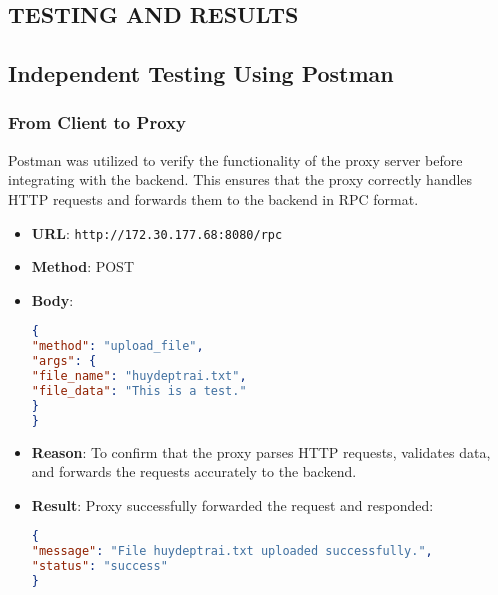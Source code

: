 \documentclass{article}
\begin{document}
 
\subsection{TESTING AND RESULTS} %
\subsection*{Independent Testing Using Postman}

\subsubsection*{From Client to Proxy}
Postman was utilized to verify the functionality of the proxy server before integrating with the backend. This ensures that the proxy correctly handles HTTP requests and forwards them to the backend in RPC format.
\begin{itemize}
\item \textbf{URL}: \texttt{http://172.30.177.68:8080/rpc}
\item \textbf{Method}: POST
\item \textbf{Body}:
\begin{lstlisting}[language=JSON]
{
"method": "upload_file",
"args": {
"file_name": "huydeptrai.txt",
"file_data": "This is a test."
}
}
\end{lstlisting}
\item \textbf{Reason}: To confirm that the proxy parses HTTP requests, validates data, and forwards the requests accurately to the backend.
\item \textbf{Result}: Proxy successfully forwarded the request and responded:
\begin{lstlisting}[language=JSON]
{
"message": "File huydeptrai.txt uploaded successfully.",
"status": "success"
}
\end{lstlisting}
\end{itemize}
\end{document}
